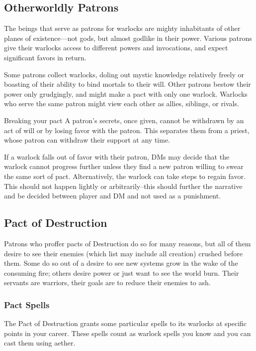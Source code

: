 \subsection{Otherworldly Patrons}

The beings that serve as patrons for warlocks are mighty inhabitants of other planes of existence—not gods, but almost godlike in their power. Various patrons give their warlocks access to different powers and invocations, and expect significant favors in return.

Some patrons collect warlocks, doling out mystic knowledge relatively freely or boasting of their ability to bind mortals to their will. Other patrons bestow their power only grudgingly, and might make a pact with only one warlock. Warlocks who serve the same patron might view each other as allies, siblings, or rivals.

\begin{DndComment}{Breaking your pact}
	A patron's secrets, once given, cannot be withdrawn by an act of will or by losing favor with the patron. This separates them from a priest, whose patron can withdraw their support at any time.

	If a warlock falls out of favor with their patron, DMs may decide that the warlock cannot progress further unless they find a new patron willing to swear the same sort of pact. Alternatively, the warlock can take steps to regain favor. This should not happen lightly or arbitrarily--this should further the narrative and be decided between player and DM and not used as a punishment.
\end{DndComment}

\subsection{Pact of Destruction}

Patrons who proffer pacts of Destruction do so for many reasons, but all of them desire to see their enemies (which list may include all creation) crushed before them. Some do so out of a desire to see new systems grow in the wake of the consuming fire; others desire power or just want to see the world burn. Their servants are warriors, their goals are to reduce their enemies to ash.

\subsubsection{Pact Spells}

The Pact of Destruction grants some particular spells to its warlocks at specific points in your career. These spells count as warlock spells you know and you can cast them using aether.

